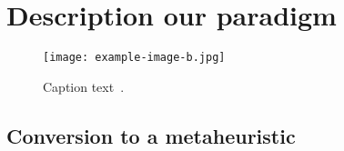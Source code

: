 
\section{Description our paradigm}\label{ch1:theidea}


\begin{figure}[t]
\centering\texttt{[image: example-image-b.jpg]} 
\caption{Caption text\label{example-image-b}~\cite{GSL}.}
\end{figure}


\subsection{Conversion to a metaheuristic}

